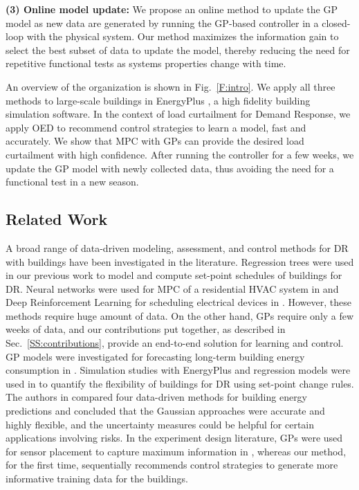 \noindent \textbf{(3) Online model update:} We propose an online method to update the GP model as new data are generated by running the GP-based controller in a closed-loop with the physical system.
Our method maximizes the information gain to select the best subset of data to update the model, thereby reducing the need for repetitive functional tests as systems properties change with time.

An overview of the organization is shown in Fig.~\ref{F:intro}.
We apply all three methods to large-scale buildings in EnergyPlus \cite{Deru2011}, a high fidelity building simulation software.
In the context of load curtailment for Demand Response, we apply OED to recommend control strategies to learn a model, fast and accurately. We show that MPC with GPs can provide the desired load curtailment with high confidence. After running the controller for a few weeks, we update the GP model with newly collected data, thus avoiding the need for a functional test in a new season.


\subsection{Related Work}
A broad range of data-driven modeling, assessment, and control methods for DR with buildings have been investigated in the literature.
Regression trees were used in our previous work \cite{JainCDC2017,JainACC2017,JainTCPS2018} to model and compute set-point schedules of buildings for DR.
Neural networks were used for MPC of a residential HVAC system in \cite{Afram2017} and Deep Reinforcement Learning for scheduling electrical devices in \cite{Mocanu2017}.
However, these methods require huge amount of data. 
On the other hand, GPs require only a few weeks of data, and our contributions put together, as described in Sec.~\ref{SS:contributions}, provide an end-to-end solution for learning and control.
GP models were investigated for forecasting long-term building energy consumption in \cite{nohetal13data}.
Simulation studies with EnergyPlus and regression models were used in \cite{yinetal16quantifying} to quantify the flexibility of buildings for DR using set-point change rules.
The authors in \cite{zhangetal15comparisons} compared four data-driven methods for building energy predictions and concluded that the Gaussian approaches were accurate and highly flexible, and the uncertainty measures could be helpful for certain applications involving risks.
In the experiment design literature, GPs were used for sensor placement to capture maximum information in \cite{Krause2008}, whereas our method, for the first time, sequentially recommends control strategies to generate more informative training data for the buildings.


